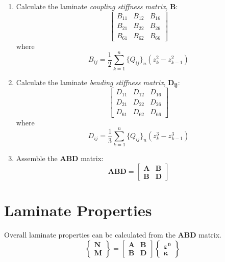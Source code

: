 \documentclass{article}
\begin{document}
\begin{enumerate}
    \item Calculate the laminate \emph{coupling stiffness matrix}, $\bm{B}$:
    \begin{equation}
        \left[\begin{array}{ccc} B_{11} & B_{12} & B_{16} \\ B_{21} & B_{22} & B_{26} \\ B_{61} & B_{62} & B_{66}\end{array}\right]
    \end{equation}
    where
    \begin{equation}
        B_{ij} = \frac{1}{2} \sum_{k=1}^{n} \big\{Q_{ij}\big\}_{n} \left(z_{k}^{2} - z_{k-1}^{2}\right)
    \end{equation}

    \item Calculate the laminate \emph{bending stiffness matrix}, $\bm{D_{ij}}$:
    \begin{equation}
        \left[\begin{array}{ccc} D_{11} & D_{12} & D_{16} \\ D_{21} & D_{22} & D_{26} \\ D_{61} & D_{62} & D_{66}\end{array}\right]
    \end{equation}
    where
    \begin{equation}
        D_{ij} = \frac{1}{3} \sum_{k=1}^{n} \big\{Q_{ij}\big\}_{n} \left(z_{k}^{3} - z_{k-1}^{3}\right)
    \end{equation}

    \item Assemble the $\bm{ABD}$ matrix:
    \begin{equation}
        \bm{ABD} = \left[\begin{array}{c|c}
            \bm{A} & \bm{B} \\
            \hline
            \bm{B} & \bm{D}
        \end{array} \right]
    \end{equation}
    \end{enumerate}

\section{Laminate Properties}
Overall laminate properties can be calculated from the $\bm{ABD}$ matrix.
\begin{equation}
    \left\{\begin{array}{c} \bm{N} \\ \hline \bm{M} \end{array} \right\} = \left[\begin{array}{c|c} \bm{A} & \bm{B} \\ \hline \bm{B} & \bm{D} \end{array} \right] \left\{ \begin{array}{c} \bm{\varepsilon^{0}} \\ \hline \bm{\kappa} \end{array} \right\}
\end{equation}
\end{document}
